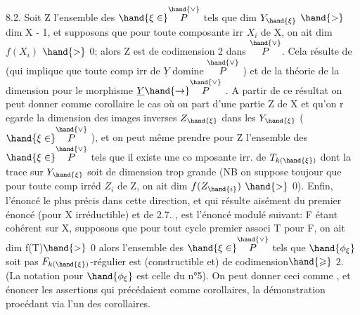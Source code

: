 
8.2. Soit Z l'ensemble des $\hand{\xi\in}\overset{\hand{\vee}}{P}$ tels que dim $Y_{\hand{\xi}}$ $\hand{>}$ dim X - 1,\hand{\unsure{\xi}}
et supposons que pour toute composante irr $X_i$ de X, on ait dim $f(X_i)$ $\hand{>}$ 0;
alors Z est de codimension 2 dans $\overset{\hand{\vee}}{P}$.  Cela
résulte de 
 (qui implique que toute comp irr de $\underline{Y}$ domine $\overset{\hand{\vee}}{P}$ ) et de
la théorie de la dimension pour le morphisme $\underline{Y} \hand{\to} \overset{\hand{\vee}}{P}$ . A partir de ce
résultat  on peut donner comme corollaire le cas où on
part d'une partie   Z de X et qu'on r egarde la dimension des
images inverses $Z_{\hand{\xi}}$ dans les $Y_{\hand{\xi}}$ ( $\hand{\xi\in}\overset{\hand{\vee}}{P}$ ), et on peut même prendre pour
Z l'ensemble des $\hand{\xi\in}\overset{\hand{\vee}}{P}$ tels que il existe une co mposante irr. de $T_{k(\hand{\xi})}$
dont la trace sur $Y_{\hand{\xi}}$ soit de dimension trop grande (NB on suppose toujour
que pour toute comp irréd $Z_i$ de Z, on ait dim $f(Z_{\hand{i}})$ $\hand{>}$ 0). Enfin, l'énoncé
le plus précis dans cette direction, et qui résulte aisément du premier
énoncé (pour X irréductible) et de 2.7. , est l'énoncé modulé suivant:
F étant cohérent sur X,  supposons que pour tout cycle premier associ
T pour F, on ait dim f(T)$\hand{>}$ 0\unsure{;|,} alors l'ensemble des $\hand{\xi\in}\overset{\hand{\vee}}{P}$ tels que
$\hand{\phi_\xi}$  soit pas $F_{k(\hand{\xi})}$-régulier est (constructible et) de codimension$\hand{\geqslant}$ 2.
\margin{\textbar} (La notation pour $\hand{\phi_\xi}$ est celle du n°5). On peut donner ceci comme
\margin{\textbar} , et énoncer les  assertions qui précédaient
\margin{\textbar} comme corollaires, la démonstration procédant via l'un des corollaires.

